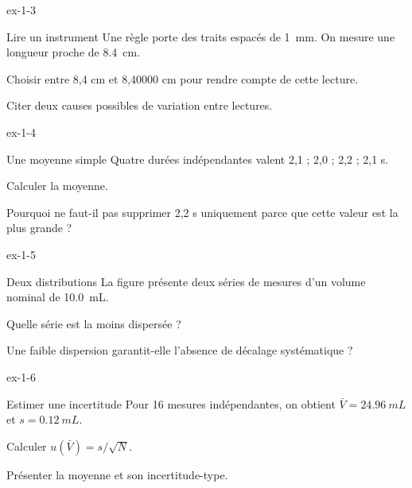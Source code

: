 \begin{blocLivre}{ex-1-3}\begin{exercice}[1]{Lire un instrument}
Une règle porte des traits espacés de \qty{1}{mm}. On mesure une longueur proche de \qty{8,4}{cm}.
\begin{questions}
\item Choisir entre 8,4 cm et 8,40000 cm pour rendre compte de cette lecture.
\item Citer deux causes possibles de variation entre lectures.
\end{questions}
\end{exercice}\end{blocLivre}
\begin{blocLivre}{ex-1-4}\begin{exercice}[1]{Une moyenne simple}
Quatre durées indépendantes valent 2,1 ; 2,0 ; 2,2 ; 2,1 s.
\begin{questions}
\item Calculer la moyenne.
\item Pourquoi ne faut-il pas supprimer 2,2 s uniquement parce que cette valeur est la plus grande ?
\end{questions}
\end{exercice}\end{blocLivre}
\begin{blocLivre}{ex-1-5}\begin{exercice}[2]{Deux distributions}
La figure présente deux séries de mesures d’un volume nominal de \qty{10,0}{mL}.
\begin{questions}
\item Quelle série est la moins dispersée ?
\item Une faible dispersion garantit-elle l’absence de décalage systématique ?
\end{questions}
\end{exercice}\end{blocLivre}
\begin{blocLivre}{ex-1-6}\begin{exercice}[2]{Estimer une incertitude}
Pour 16 mesures indépendantes, on obtient $\bar V=\qty{24,96}{mL}$ et $s=\qty{0,12}{mL}$.
\begin{questions}
\item Calculer $u(\bar V)=s/\sqrt N$.
\item Présenter la moyenne et son incertitude-type.
\end{questions}
\end{exercice}\end{blocLivre}
